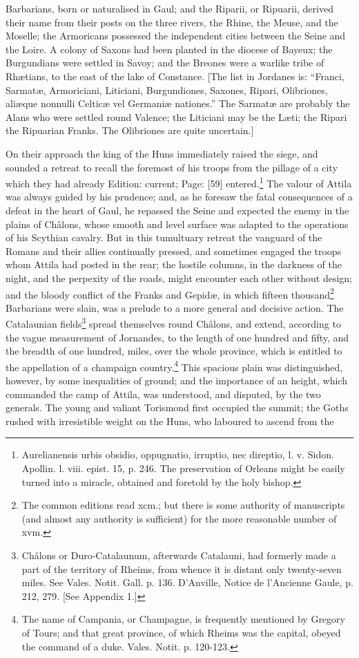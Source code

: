 {Barbarians, born or naturalised in Gaul; and the Riparii, or Ripuarii, derived their name from their posts on the three rivers, the Rhine, the Meuse, and the Moselle; the Armoricans possessed the independent cities between the Seine and the Loire. A colony of Saxons had been planted in the diocese of Bayeux; the Burgundians were settled in Savoy; and the Breones were a warlike tribe of Rhætians, to the east of the lake of Constance. [The list in Jordanes is: \texthebrew{“}Franci, Sarmatæ, Armoriciani, Liticiani, Burgundiones, Saxones, Ripari, Olibriones, aliæque nonnulli Celticæ vel Germaniæ nationes.\texthebrew{}” The Sarmatæ are probably the Alans who were settled round Valence; the Liticiani may be the Læti; the Ripari the Ripuarian Franks. The Olibriones are quite uncertain.]}

On their approach the king of the Huns immediately raised the siege, and sounded a retreat to recall the foremost of his troops from the pillage of a city which they had already Edition: current; Page: [59] entered.\footnote{Aurelianensis urbis obsidio, oppugnatio, irruptio, nec direptio, l. v. Sidon. Apollin. l. viii. epist. 15, p. 246. The preservation of Orleans might be easily turned into a miracle, obtained and foretold by the holy bishop.} The valour of Attila was always guided by his prudence; and, as he foresaw the fatal consequences of a defeat in the heart of Gaul, he repassed the Seine and expected the enemy in the plains of Châlons, whose smooth and level surface was adapted to the operations of his Scythian cavalry. But in this tumultuary retreat the vanguard of the Romans and their allies continually pressed, and sometimes engaged the troops whom Attila had posted in the rear; the hostile columns, in the darkness of the night, and the perpexity of the roads, might encounter each other without design; and the bloody conflict of the Franks and Gepidæ, in which fifteen thousand\footnote{The common editions read xcm.; but there is some authority of manuscripts (and almost any authority is sufficient) for the more reasonable number of xvm.} Barbarians were slain, was a prelude to a more general and decisive action. The Catalaunian fields\footnote{Châlons or Duro-Catalaunum, afterwards Catalauni, had formerly made a part of the territory of Rheims, from whence it is distant only twenty-seven miles. See Vales. Notit. Gall. p. 136. D\texthebrew{}’Anville, Notice de l\texthebrew{}’Ancienne Gaule, p. 212, 279. [See Appendix 1.]} spread themselves round Châlons, and extend, according to the vague measurement of Jornandes, to the length of one hundred and fifty, and the breadth of one hundred, miles, over the whole province, which is entitled to the appellation of a champaign country.\footnote{The name of Campania, or Champagne, is frequently mentioned by Gregory of Tours; and that great province, of which Rheims was the capital, obeyed the command of a duke. Vales. Notit. p. 120-123.} This spacious plain was distinguished, however, by some inequalities of ground; and the importance of an height, which commanded the camp of Attila, was understood, and disputed, by the two generals. The young and valiant Torismond first occupied the summit; the Goths rushed with irresistible weight on the Huns, who laboured to ascend from the 
